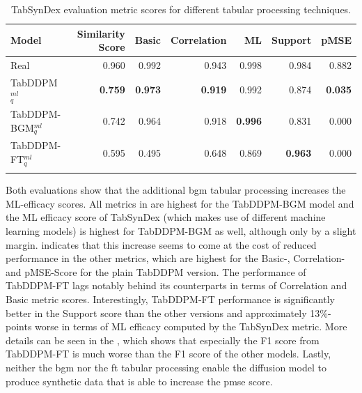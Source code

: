 \begin{table}[h]
	\centering
	\begin{tabular}{lrrrrrr}
		\toprule
		\textbf{Model}         & \textbf{Similarity Score} & \textbf{Basic} & \textbf{Correlation} & \textbf{ML}    & \textbf{Support} & \textbf{pMSE}  \\
		\midrule
		Real                   & 0.960                     & 0.992          & 0.943                & 0.998          & 0.984            & 0.882          \\
		TabDDPM$^{ml}_{q}$     & \textbf{0.759}            & \textbf{0.973} & \textbf{0.919}       & 0.992          & 0.874            & \textbf{0.035} \\
		TabDDPM-BGM$^{ml}_{q}$ & 0.742                     & 0.964          & 0.918                & \textbf{0.996} & 0.831            & 0.000          \\
		TabDDPM-FT$^{ml}_{q}$  & 0.595                     & 0.495          & 0.648                & 0.869          & \textbf{0.963}   & 0.000          \\
		\bottomrule
		\multicolumn{7}{c}{}\\[-0.6em]
	\end{tabular}
	\caption[Experiment 1 TabSynDex]{TabSynDex evaluation metric scores for different tabular processing techniques.}
	\label{tab:exp1-sim}
\end{table}

Both evaluations show that the additional \gls{bgm} tabular processing increases the ML-efficacy scores.
All metrics in  are highest for the TabDDPM-BGM model and the ML efficacy score of TabSynDex (which makes use of different machine learning models)
is highest for TabDDPM-BGM as well, although only by a slight margin.
 indicates that this increase seems to come at the cost of reduced performance in the other metrics, which are highest for the Basic-, Correlation- and pMSE-Score for the plain TabDDPM version.
The performance of TabDDPM-FT lags notably behind its counterparts in terms of Correlation and Basic metric scores.
Interestingly, TabDDPM-FT performance is significantly better in the Support score than the other versions and approximately 13\%-points worse in terms of ML efficacy computed by the TabSynDex metric.
More details can be seen in the , which shows that especially the F1 score from TabDDPM-FT is much worse than the F1 score of the other models.
Lastly, neither the \gls{bgm} nor the \gls{ft} tabular processing enable the diffusion model to produce synthetic data that is able to increase the \gls{pmse} score.


